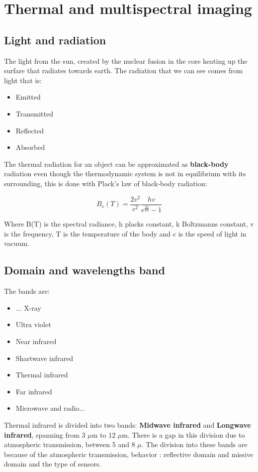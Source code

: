 \section{Thermal and multispectral imaging}

	\subsection{Light and radiation}
	The light from the sun, created by the nuclear fusion in the core heating up the surfare that radiates towards earth. The radiation that we can see comes from light that is:
		
		\begin{itemize}
			\item Emitted
			\item Transmitted
			\item Reflected
			\item Absorbed
		\end{itemize}

	The thermal radiation for an object can be approximated as \textbf{black-body} radiation even though the thermodynamic system is not in equilibrium with its surrounding, this is done with Plack's law of black-body radiation:

		\begin{equation}
			B_v(T) = \frac{2v^2} {c^2} \frac{hv} {e^{\frac{hv} {kT} }-1}   		  
		\end{equation}

	Where B(T) is the spectral radiance, h placks constant, k Boltzmanns constant, v is the frequency, T is the temperature of the body and c is the speed of light in vacuum.
	
	\subsection{Domain and wavelengths band}
	The bands are:
	\begin{itemize}
		\item  ... X-ray 
		\item Ultra violet
		\item Near infrared
		\item Shartwave infrared
		\item Thermal infrared
		\item Far infrared
		\item Microwave and radio...
	\end{itemize}
	Thermal infrared is divided into two bands: \textbf{Midwave infrared} and \textbf{Longwave infrared}, spanning from 3 $\mu$m to 12 $\mu$m. There is a gap in this division due to atmospheric transmission, between 5 and 8 $\mu$.
	The division into these bands are because of the atmospheric transmission, behavior : reflective domain and missive domain and the type of sensors.

